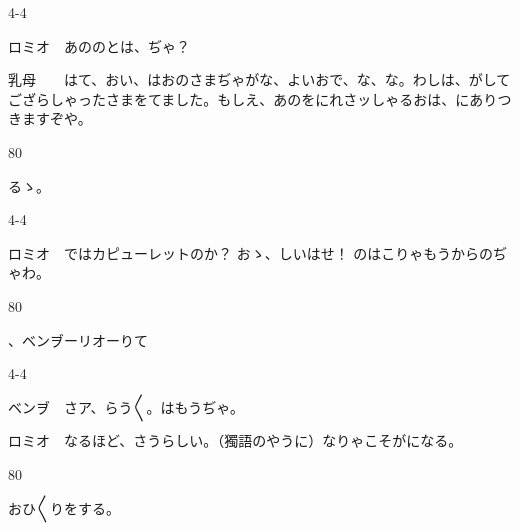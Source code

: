 \documentclass[tate,paper=b6j,jafontsize=9pt]{jlreq}
\begin{document}
\begin{azconvIndented}{4\zw}{-4\zw}

ロミオ　あののとは、ぢゃ？

乳母　　はて、おい、はおのさまぢゃがな、よいおで、な、な。わしは、がしてござらしゃったさまをてました。もしえ、あのをにれさッしゃるおは、にありつきますぞや。

\end{azconvIndented}
\begin{azconvIndented}{8\zw}{0\zw}

るゝ。

\end{azconvIndented}
\begin{azconvIndented}{4\zw}{-4\zw}

ロミオ　ではカピューレットのか？ おゝ、しいはせ！ のはこりゃもうからのぢゃわ。

\end{azconvIndented}
\begin{azconvIndented}{8\zw}{0\zw}

、ベンヺーリオーりて

\end{azconvIndented}
\begin{azconvIndented}{4\zw}{-4\zw}

ベンヺ　さア、らう{〳〵}。はもうぢゃ。

ロミオ　なるほど、さうらしい。（獨語のやうに）なりゃこそがになる。

\end{azconvIndented}
\begin{azconvIndented}{8\zw}{0\zw}

おひ{〳〵}りをする。

\end{azconvIndented}
\end{document}
